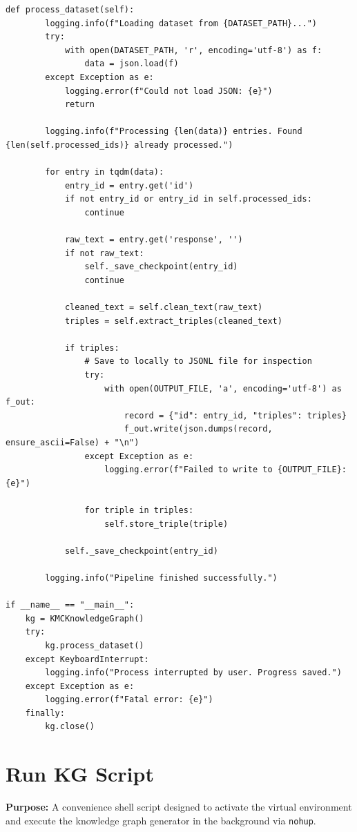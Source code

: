 \documentclass[11pt]{article}
\begin{document}
\begin{lstlisting}[style=pythoncode, caption={kg\_generator.py}]
    def process_dataset(self):
        logging.info(f"Loading dataset from {DATASET_PATH}...")
        try:
            with open(DATASET_PATH, 'r', encoding='utf-8') as f:
                data = json.load(f)
        except Exception as e:
            logging.error(f"Could not load JSON: {e}")
            return

        logging.info(f"Processing {len(data)} entries. Found {len(self.processed_ids)} already processed.")
        
        for entry in tqdm(data):
            entry_id = entry.get('id')
            if not entry_id or entry_id in self.processed_ids:
                continue
                
            raw_text = entry.get('response', '')
            if not raw_text:
                self._save_checkpoint(entry_id)
                continue
                
            cleaned_text = self.clean_text(raw_text)
            triples = self.extract_triples(cleaned_text)
            
            if triples:
                # Save to locally to JSONL file for inspection
                try:
                    with open(OUTPUT_FILE, 'a', encoding='utf-8') as f_out:
                        record = {"id": entry_id, "triples": triples}
                        f_out.write(json.dumps(record, ensure_ascii=False) + "\n")
                except Exception as e:
                    logging.error(f"Failed to write to {OUTPUT_FILE}: {e}")

                for triple in triples:
                    self.store_triple(triple)
            
            self._save_checkpoint(entry_id)

        logging.info("Pipeline finished successfully.")

if __name__ == "__main__":
    kg = KMCKnowledgeGraph()
    try:
        kg.process_dataset()
    except KeyboardInterrupt:
        logging.info("Process interrupted by user. Progress saved.")
    except Exception as e:
        logging.error(f"Fatal error: {e}")
    finally:
        kg.close()
\end{lstlisting}


\section{Run KG Script} \label{sec:runkg}
\textbf{Purpose:} A convenience shell script designed to activate the virtual environment and execute the knowledge graph generator in the background via \texttt{nohup}.
\end{document}
